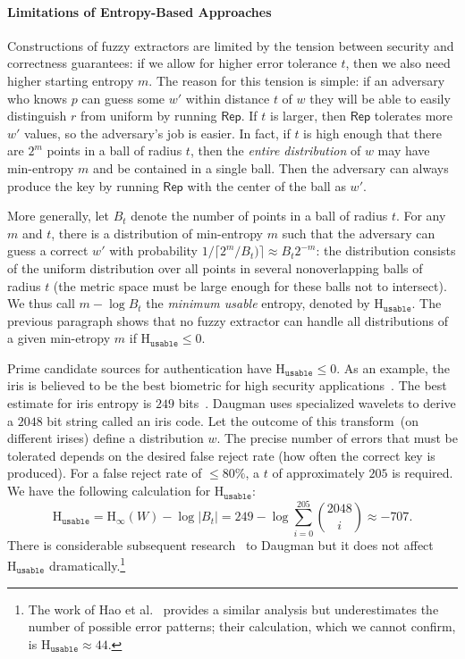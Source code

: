 \documentclass[11pt]{article}
\newcommand{\class}[1]{{\ensuremath{\mathsf{#1}}}}
\newcommand{\rep}{\ensuremath{\class{Rep}}\xspace}
\newcommand{\Hoo}{\mathrm{H}_\infty}
\newcommand{\Huse}{\mathrm{H}_{\mathtt{usable}}}
\begin{document}
\paragraph{Limitations of Entropy-Based Approaches}
Constructions of fuzzy extractors are limited by the tension between security and correctness guarantees: if we allow for higher error tolerance $t$, then we also need higher starting entropy $m$. The reason for this tension is simple: if an adversary who knows $p$ can guess some $w'$ within distance $t$ of $w$ they will be able to easily distinguish $r$ from uniform by running $\rep$. If $t$ is larger, then $\rep$ tolerates more $w'$ values, so the adversary's job is easier. In fact, if $t$ is high enough that there are $2^m$ points in a ball of radius $t$, then the \emph{entire distribution} of $w$ may have min-entropy $m$ and be contained in a single ball.  Then the adversary can always produce the key by running $\rep$ with the center of the ball as $w'$.

More generally, let $B_t$ denote the number of points in a ball of radius $t$. For any $m$ and $t$, there is a distribution of min-entropy $m$ such that the adversary can guess a correct $w'$ with probability $1/\lceil 2^m/B_t) \rceil\approx B_t 2^{-m}$: the distribution consists of the uniform distribution over all points in several nonoverlapping balls of radius $t$ (the metric space must be large enough for these balls not to intersect). We thus call $m-\log B_t$ the \emph{minimum usable} entropy, denoted by $\Huse$. The previous paragraph shows that  no fuzzy extractor can handle all distributions of a given min-etropy $m$ if  $\Huse\le 0$.

Prime candidate sources for authentication have $\Huse\le 0$.  As an example, the iris is believed to be the best biometric for high security applications~\cite{prabhakar2003biometric}.  The best estimate for iris entropy is $249$ bits~\cite{daugman2004}.  Daugman uses specialized wavelets to derive a $2048$ bit string called an iris code.  Let the outcome of this transform~(on different irises) define a distribution $w$.  The precise number of errors that must be tolerated depends on the desired false reject rate (how often the correct key is produced).  For a false reject rate of $\le 80\%$, a $t$ of approximately $205$ is required.  We have the following calculation for $\Huse$:
\[
\Huse = \Hoo(W) - \log |B_t|
= 249 - \log \sum_{i=0}^{205} {2048 \choose i} \approx -707.
\]
There is considerable subsequent research~\cite{gentile2009slic,gentile2009efficient,rathgeb2011combining} to Daugman but it does not affect $\Huse$ dramatically.\footnote{The work of Hao et al.~\cite[Section 4.3]{hao2006combining} provides a similar analysis but underestimates the number of possible error patterns; their calculation, which we cannot confirm, is $\Huse \approx 44$.}  
\end{document}
